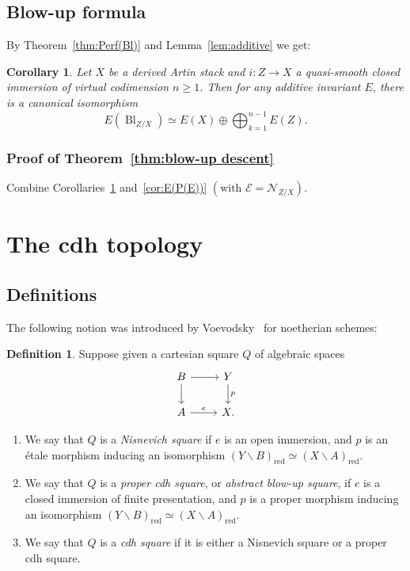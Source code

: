 \documentclass[11pt]{article}
\newtheorem{coro}[theo]{Corollary}
\theoremstyle{definition}
\newtheorem{defi}[theo]{Definition}
\numberwithin{equation}{section}
\numberwithin{figure}{section}
\numberwithin{table}{section}
\newcommand{\sE}{\ensuremath{\mathcal{E}}\xspace}
\newcommand{\sN}{\ensuremath{\mathcal{N}}\xspace}
\renewcommand{\setminus}{\smallsetminus}
\renewcommand{\ge}{\geqslant}
\newcommand{\red}{{\mrm{red}}}
\DeclareMathOperator{\Bl}{Bl}
\newcommand{\mrm}[1]{\ensuremath{\mathrm{#1}}\xspace}
\newcommand*{\romanenumi}{\renewcommand*{\theenumi}{\roman{enumi}}}
\begin{document}
\subsection{Blow-up formula}\label{ssec:blowup/additive}


By Theorem~\ref{thm:Perf(Bl)} and Lemma~\ref{lem:additive} we get:

\begin{coro}\label{cor:E(Bl_{Z/X})}
Let $X$ be a derived Artin stack and $i : Z \to X$ a quasi-smooth closed immersion of virtual codimension $n\ge 1$. Then for any additive invariant $E$, there is a canonical isomorphism
\[
E\left(\Bl_{Z/X}\right) \simeq E(X) \oplus \bigoplus_{k=1}^{n-1} E(Z).
\]
\end{coro}

\subsubsection{Proof of Theorem~\ref{thm:blow-up descent}}\label{sssec:proof of blow-up descent}

Combine Corollaries~\ref{cor:E(Bl_{Z/X})} and~\ref{cor:E(P(E))} $\left(\text{with }\sE = \sN_{Z/X}\right)$.

\section{The cdh topology}\label{sec:cdh}

\subsection{Definitions}

The following notion was introduced by Voevodsky~\cite{VoevodskyCdh} for noetherian schemes:

\begin{defi}\label{defn:cdh square}
Suppose given a cartesian square $Q$ of algebraic spaces
\begin{equation}\label{eq:cdh square}
\begin{tikzcd}
B \ar{r}\ar{d} & Y \ar{d}{p}
\\
A \ar{r}{e} & X.
\end{tikzcd}
\end{equation}
\begin{enumerate}\romanenumi
\item \label{item:cdh square/Nis square}
We say that $Q$ is a \emph{Nisnevich square} if $e$ is an open immersion, and $p$ is an étale morphism inducing an isomorphism $(Y\setminus B)_\red \simeq (X\setminus A)_\red$.
\item \label{item:cdh square/proper cdh square}
We say that $Q$ is a \emph{proper cdh square}, or \emph{abstract blow-up square}, if $e$ is a closed immersion of finite presentation, and $p$ is a proper morphism inducing an isomorphism $(Y\setminus B)_\red \simeq (X\setminus A)_\red$.
\item \label{item:cdh square/cdh square}
We say that $Q$ is a \emph{cdh square} if it is either a Nisnevich square or a proper cdh square.
\end{enumerate}
\end{defi}
\end{document}
